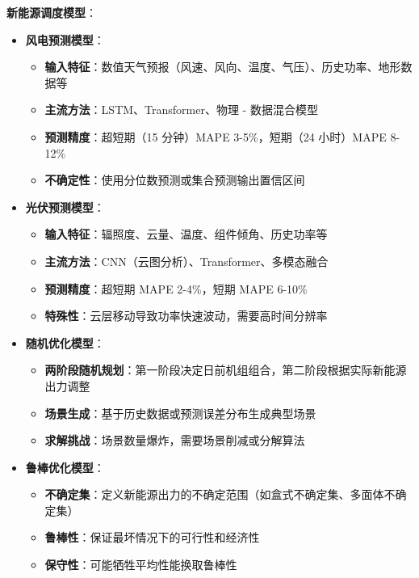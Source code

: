 \documentclass[12pt,a4paper]{article}
\begin{document}
\textbf{新能源调度模型}：

\begin{itemize}
    \item \textbf{风电预测模型}：
    \begin{itemize}
        \item \textbf{输入特征}：数值天气预报（风速、风向、温度、气压）、历史功率、地形数据等
        \item \textbf{主流方法}：LSTM、Transformer、物理 - 数据混合模型
        \item \textbf{预测精度}：超短期（15 分钟）MAPE 3-5\%，短期（24 小时）MAPE 8-12\%\cite{zhang2020review}
        \item \textbf{不确定性}：使用分位数预测或集合预测输出置信区间
    \end{itemize}
    
    \item \textbf{光伏预测模型}：
    \begin{itemize}
        \item \textbf{输入特征}：辐照度、云量、温度、组件倾角、历史功率等
        \item \textbf{主流方法}：CNN（云图分析）、Transformer、多模态融合
        \item \textbf{预测精度}：超短期 MAPE 2-4\%，短期 MAPE 6-10\%\cite{yang2018solar}
        \item \textbf{特殊性}：云层移动导致功率快速波动，需要高时间分辨率
    \end{itemize}
    
    \item \textbf{随机优化模型}：
    \begin{itemize}
        \item \textbf{两阶段随机规划}：第一阶段决定日前机组组合，第二阶段根据实际新能源出力调整
        \item \textbf{场景生成}：基于历史数据或预测误差分布生成典型场景
        \item \textbf{求解挑战}：场景数量爆炸，需要场景削减或分解算法
    \end{itemize}
    
    \item \textbf{鲁棒优化模型}：
    \begin{itemize}
        \item \textbf{不确定集}：定义新能源出力的不确定范围（如盒式不确定集、多面体不确定集）
        \item \textbf{鲁棒性}：保证最坏情况下的可行性和经济性
        \item \textbf{保守性}：可能牺牲平均性能换取鲁棒性
    \end{itemize}
\end{itemize}
\end{document}
